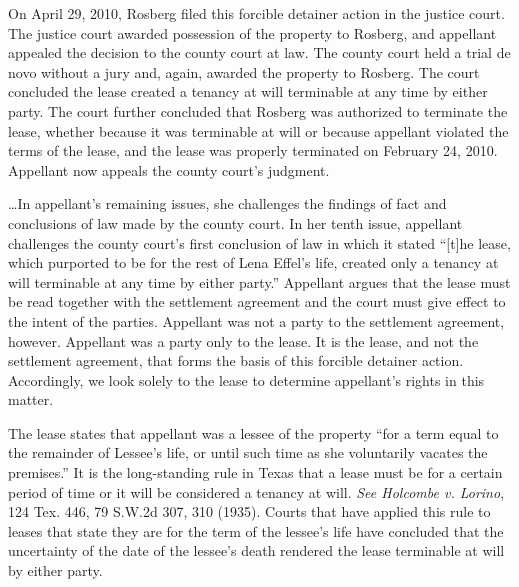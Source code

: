 On April 29, 2010, Rosberg filed this forcible detainer action in the justice
court. The justice court awarded possession of the property to Rosberg, and
appellant appealed the decision to the county court at law. The county court
held a trial de novo without a jury and, again, awarded the property to
Rosberg. The court concluded the lease created a tenancy at will terminable at
any time by either party. The court further concluded that Rosberg was
authorized to terminate the lease, whether because it was terminable at will or
because appellant violated the terms of the lease, and the lease was properly
terminated on February 24, 2010. Appellant now appeals the county court's
judgment.


\ldots In appellant's remaining issues, she challenges the findings of fact and
conclusions of law made by the county court. In her tenth issue, appellant
challenges the county court's first conclusion of law in which it stated
``[t]he lease, which purported to be for the rest of Lena Effel's life, created
only a tenancy at will terminable at any time by either party.'' Appellant
argues that the lease must be read together with the settlement agreement and
the court must give effect to the intent of the parties. Appellant was not a
party to the settlement agreement, however. Appellant was a party only to the
lease. It is the lease, and not the settlement agreement, that forms the basis
of this forcible detainer action. Accordingly, we look solely to the lease to
determine appellant's rights in this matter.

The lease states that appellant was a lessee of the property ``for a term equal
to the remainder of Lessee's life, or until such time as she voluntarily
vacates the premises.'' It is the long-standing rule in Texas that a lease must
be for a certain period of time or it will be considered a tenancy at will.
\textit{See Holcombe v. Lorino}, 124 Tex. 446, 79 S.W.2d 307, 310 (1935).
Courts that have applied this rule to leases that state they are for the term
of the lessee's life have concluded that the uncertainty of the date of the
lessee's death rendered the lease terminable at will by either party.

